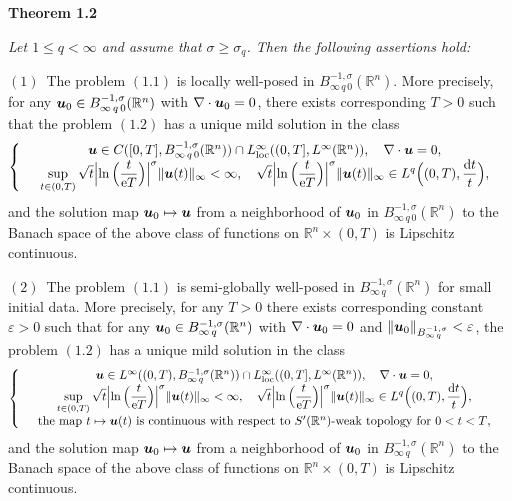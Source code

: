 \documentclass[11pt]{article}
\newcommand{\rmd}{\mbox{\rm d}}
\newcommand{\bfu}{{\mbox{\boldmath $u$}}}
\newcommand{\rme}{{\rm e}}
\begin{document}
  {\bf Theorem 1.2}\ \ {\em Let $1\leqslant q<\infty$ and assume that $\sigma\geqslant\sigma_q$. Then the following assertions hold:

  $(1)$\ The problem $(1.1)$ is locally well-posed in $B^{-1,\sigma}_{\infty\,q\,0}(\mathbb{R}^n)$. More precisely, for any $\bfu_0\in
  B^{-1,\sigma}_{\infty\,q\,0}(\mathbb{R}^n)$ with $\nabla\cdot\bfu_0=0$, there exists corresponding $T>0$ such that the problem $(1.2)$ has a unique
  mild solution in the class
\begin{equation}
\left\{
\begin{array}{rcl}
  &\bfu\in C([0,T],B^{-1,\sigma}_{\infty\,q\,0}(\mathbb{R}^n))\cap L^\infty_{\rm loc}((0,T],L^\infty(\mathbb{R}^n)), \quad
  \nabla\cdot\bfu=0,& \\
  &\displaystyle\sup_{t\in (0,T)}\sqrt{t}\Big|\!\ln\Big(\frac{t}{\rme T}\Big)\Big|^{\sigma}\|\bfu(t)\|_{\infty}<\infty, \quad
  \sqrt{t}\Big|\!\ln\Big(\frac{t}{\rme T}\Big)\Big|^{\sigma}\|\bfu(t)\|_{\infty}\in L^q\Big((0,T),\frac{\rmd t}{t}\Big),&
\end{array}
\right.
\end{equation}
  and the solution map $\bfu_0\mapsto \bfu$ from a neighborhood of $\bfu_0$ in $B^{-1,\sigma}_{\infty\,q\,0}(\mathbb{R}^n)$ to the Banach space of the
  above class of functions on $\mathbb{R}^n\times (0,T)$ is Lipschitz continuous.

  $(2)$\ The problem $(1.1)$ is semi-globally well-posed in $B^{-1,\sigma}_{\infty\, q}(\mathbb{R}^n)$ for small initial data. More precisely, for any
  $T>0$ there exists corresponding constant $\varepsilon>0$ such that for any $\bfu_0\in B^{-1,\sigma}_{\infty\, q}(\mathbb{R}^n)$ with $\nabla\cdot
  \bfu_0=0$ and $\|\bfu_0\|_{B^{-1,\sigma}_{\infty\, q}}<\varepsilon$, the problem $(1.2)$ has a unique mild solution in the class
\begin{equation}
\left\{
\begin{array}{rcl}
  &\bfu\in L^\infty((0,T),B^{-1,\sigma}_{\infty\, q}(\mathbb{R}^n))\cap L^\infty_{\rm loc}((0,T],L^\infty(\mathbb{R}^n)), \quad
  \nabla\cdot\bfu=0,& \\
  &\displaystyle\sup_{t\in (0,T)}\sqrt{t}\Big|\!\ln\Big(\frac{t}{\rme T}\Big)\Big|^{\sigma}\|\bfu(t)\|_{\infty}<\infty, \quad
  \sqrt{t}\Big|\!\ln\Big(\frac{t}{\rme T}\Big)\Big|^{\sigma}\|\bfu(t)\|_{\infty}\in L^q\Big((0,T),\frac{\rmd t}{t}\Big),& \\
  &\mbox{the map $t\mapsto\bfu(t)$ is continuous with respect to $S'(\mathbb{R}^n)$-weak topology for $0<t<T$},&
\end{array}
\right.
\end{equation}
  and the solution map $\bfu_0\mapsto \bfu$ from a neighborhood of $\bfu_0$ in $B^{-1,\sigma}_{\infty\, q}(\mathbb{R}^n)$ to the Banach space of the
  above class of functions on $\mathbb{R}^n\times (0,T)$ is Lipschitz continuous.}
\medskip
\end{document}
